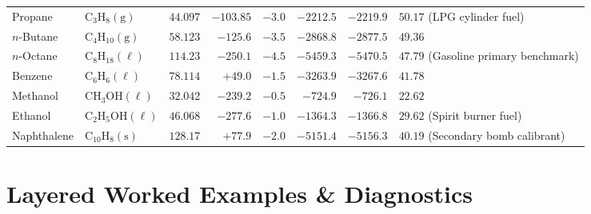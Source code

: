 \begin{center}
\begin{tabularx}{\linewidth}{@{}l l r r r r r X@{}}
Propane & $\mathrm{C_3H_8(g)}$ & $44.097$ & $-103.85$ & $-3.0$ & $-2212.5$ & $-2219.9$ & $50.17$ (LPG cylinder fuel) \\
$n$-Butane & $\mathrm{C_4H_{10}(g)}$ & $58.123$ & $-125.6$ & $-3.5$ & $-2868.8$ & $-2877.5$ & $49.36$ \\
$n$-Octane & $\mathrm{C_8H_{18}(\ell)}$ & $114.23$ & $-250.1$ & $-4.5$ & $-5459.3$ & $-5470.5$ & $47.79$ (Gasoline primary benchmark) \\
Benzene & $\mathrm{C_6H_6(\ell)}$ & $78.114$ & $+49.0$ & $-1.5$ & $-3263.9$ & $-3267.6$ & $41.78$ \\
Methanol & $\mathrm{CH_3OH(\ell)}$ & $32.042$ & $-239.2$ & $-0.5$ & $-724.9$ & $-726.1$ & $22.62$ \\
Ethanol & $\mathrm{C_2H_5OH(\ell)}$ & $46.068$ & $-277.6$ & $-1.0$ & $-1364.3$ & $-1366.8$ & $29.62$ (Spirit burner fuel) \\
Naphthalene & $\mathrm{C_{10}H_8(s)}$ & $128.17$ & $+77.9$ & $-2.0$ & $-5151.4$ & $-5156.3$ & $40.19$ (Secondary bomb calibrant) \\\bottomrule
\end{tabularx}
\end{center}

\section{Layered Worked Examples \& Diagnostics}
\label{sec:04.6}

